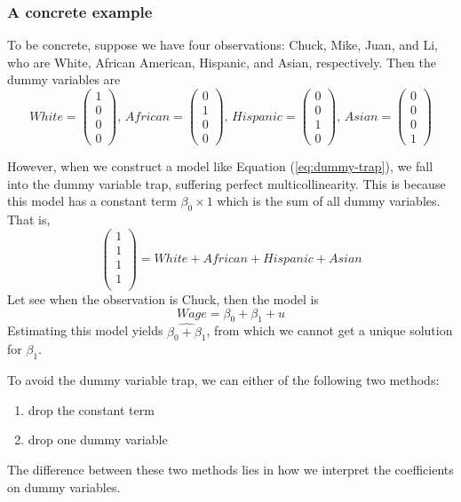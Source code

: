 \documentclass[a4paper,11pt]{article}
\begin{document}
\subsubsection*{A concrete example}
\label{sec:orgcb16bae}

To be concrete, suppose we have four observations: Chuck,
Mike, Juan, and Li, who are White, African American, Hispanic, and
Asian, respectively. Then the dummy variables are
\begin{equation*}
White =
\begin{pmatrix}
1 \\
0 \\
0 \\
0
\end{pmatrix},\,
African =
\begin{pmatrix}
0 \\
1 \\
0 \\
0
\end{pmatrix},\,
Hispanic =
\begin{pmatrix}
0 \\
0 \\
1 \\
0
\end{pmatrix},\,
Asian =
\begin{pmatrix}
0 \\
0 \\
0 \\
1
\end{pmatrix}
\end{equation*}

However, when we construct a model like Equation
(\ref{eq:dummy-trap}), we fall into the dummy variable trap, suffering
perfect multicollinearity. This is because this model has a constant
term \(\beta_0 \times 1\) which is the sum of all dummy variables. That
is,
\begin{equation*}
\begin{pmatrix}
1 \\
1 \\
1 \\
1 \\
\end{pmatrix}
= White + African + Hispanic + Asian
\end{equation*}
Let see when the observation is Chuck, then the model is
\[ Wage = \beta_0 + \beta_1 + u \]
Estimating this model yields \(\widehat{\beta_0 + \beta_1}\), from which
we cannot get a unique solution for \(\beta_1\).

To avoid the dummy variable trap, we can either of the following two
methods:
\begin{enumerate}
\item drop the constant term
\item drop one dummy variable
\end{enumerate}
The difference between these two methods lies in how we interpret the
coefficients on dummy variables.
\end{document}
